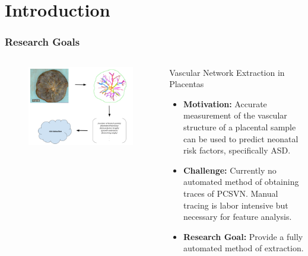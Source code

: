 \documentclass[9pt]{beamer}
\begin{document}
\section{Introduction}
\begin{frame} %
	\frametitle{Research Goals}
	\begin{columns}[c]
		\begin{column}{0.5\textwidth}
			\begin{figure}
			\includegraphics[width=\textwidth]{general_research_question.png}
			\end{figure}
		\end{column}
		\begin{column}{0.5\textwidth}
			\begin{block}{Vascular Network Extraction in Placentas}
				\begin{itemize}
					\item \textbf{Motivation:}
            Accurate measurement of the vascular structure of a placental sample
            can be used to predict neonatal risk factors, specifically ASD.
					\item \textbf{Challenge:}
						Currently no automated method of obtaining traces of
            PCSVN. Manual tracing is labor intensive but necessary
            for feature analysis.
					\item \textbf{Research Goal:} Provide a fully automated method of extraction.
          \end{itemize}
			\end{block}
		\end{column}
	\end{columns}
\end{frame}
\end{document}
